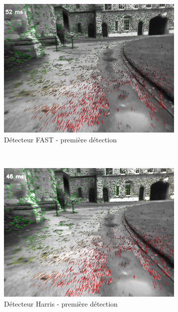 \begin{figure}[h]
	\begin{center}
		\begin{subfigure}{0.48\textwidth}
			\includegraphics[width=\textwidth]{Chapter3/graphics/Detectors_FAST_init.png} 
			\caption{Détecteur FAST - première détection}
		\end{subfigure}	
		~	
		\begin{subfigure}{0.48\textwidth}
			\includegraphics[width=\textwidth]{Chapter3/graphics/Detectors_HARRIS_init.png} 
			\caption{Détecteur Harris - première détection}
		\end{subfigure}
		\\
		\begin{subfigure}{0.48\textwidth}

\end{subfigure}
\end{center}
\end{figure}

